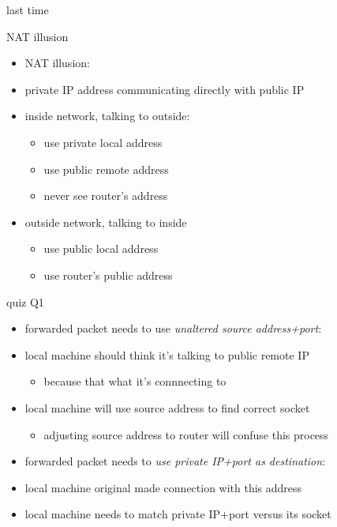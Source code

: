 \date{}
\title{}
\date{}

\begin{frame}
    \titlepage
\end{frame}

\begin{frame}{last time}
\end{frame}


\begin{frame}{NAT illusion}
    \begin{itemize}
    \item NAT illusion:
    \item private IP address communicating directly with public IP
    \vspace{.5cm}
    \item inside network, talking to outside:
        \begin{itemize}
        \item use private local address
        \item use public remote address
        \item never see router's address
        \end{itemize}
    \item outside network, talking to inside
        \begin{itemize}
        \item use public local address
        \item use router's public address
        \end{itemize}
    \end{itemize}
\end{frame}

\begin{frame}{quiz Q1}
    \begin{itemize}
    \item forwarded packet needs to use \textit{unaltered source address+port}:
    \item local machine should think it's talking to public remote IP
        \begin{itemize}
        \item because that what it's connnecting to
        \end{itemize}
    \item local machine will use source address to find correct socket
        \begin{itemize}
        \item adjusting source address to router will confuse this process
        \end{itemize}
    \vspace{.5cm}
    \item forwarded packet needs to \textit{use private IP+port as destination}:
    \item local machine original made connection with this address
    \item local machine needs to match private IP+port versus its socket
    \end{itemize}
\end{frame}

